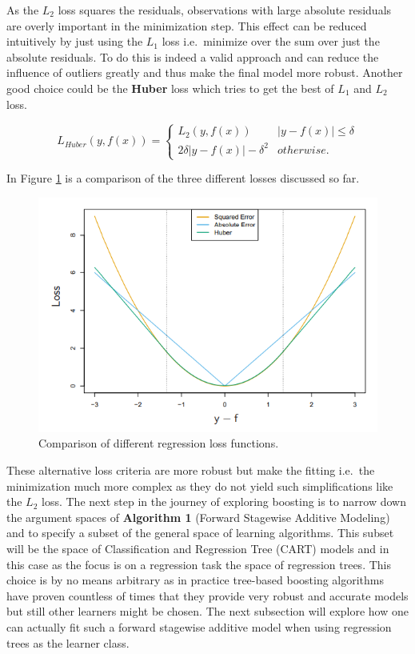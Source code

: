 \documentclass[
]{book}
\begin{document}
As the \(L_2\) loss squares the residuals, observations with large absolute residuals are overly important in the minimization step. This effect can be reduced intuitively by just using the \(L_1\) loss i.e.~minimize over the sum over just the absolute residuals. To do this is indeed a valid approach and can reduce the influence of outliers greatly and thus make the final model more robust. Another good choice could be the \textbf{Huber} loss which tries to get the best of \(L_1\) and \(L_2\) loss.\citep{elements}

\begin{equation}
  L_{Huber}(y,f(x)) = \begin{cases}L_2(y,f(x)) & |y-f(x)| \leq \delta \\
  2\delta |y-f(x)| - \delta^2 & otherwise.
  \end{cases}
  \label{eq:huberLoss}
\end{equation}

In Figure \ref{fig:lossComp} is a comparison of the three different losses discussed so far.\citep{elements}

\begin{figure}

{\centering \includegraphics[width=0.7\linewidth]{_pictures/huber_loss} 

}

\caption{Comparison of different regression loss functions.}\label{fig:lossComp}
\end{figure}

These alternative loss criteria are more robust but make the fitting i.e.~the minimization much more complex as they do not yield such simplifications like the \(L_2\) loss.\citep{elements} The next step in the journey of exploring boosting is to narrow down the argument spaces of \textbf{Algorithm 1} (Forward Stagewise Additive Modeling) and to specify a subset of the general space of learning algorithms. This subset will be the space of Classification and Regression Tree (CART) models and in this case as the focus is on a regression task the space of regression trees. This choice is by no means arbitrary as in practice tree-based boosting algorithms have proven countless of times that they provide very robust and accurate models but still other learners might be chosen.\citep[\citet{HandsOnMLwithR}]{elements} The next subsection will explore how one can actually fit such a forward stagewise additive model when using regression trees as the learner class.
\end{document}
